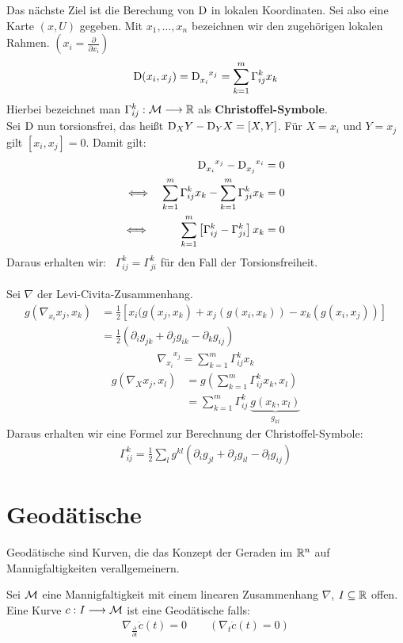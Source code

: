 Das nächste Ziel ist die Berechung von $\mathrm{D}$ in lokalen Koordinaten. Sei also eine Karte $(x, U)$ gegeben. Mit $x_1, \dots, x_n$ bezeichnen wir den zugehörigen lokalen Rahmen. $(x_i = \frac{\partial}{\partial x_i})$
\begin{align}
\mathrm{D}(x_i, x_j)= \mathrm{D}_{x_i}^{\phantom{x_i}x_j} = \sum_{k=1}^{m} \Gamma^k_{ij} x_k
\end{align}
Hierbei bezeichnet man $\Gamma^k_{ij}: \mathcal{M} \longrightarrow \mathbb{R}$ als \textbf{Christoffel-Symbole}. \\
Sei $\mathrm{D}$ nun torsionsfrei, das heißt $\mathrm{D}_XY - \mathrm{D}_YX = [X, Y]$.
Für $X=x_i$ und $Y=x_j$ gilt $[x_i, x_j]=0$. Damit gilt: 
\begin{align*}
\mathrm{D}_{x_i}^{\phantom{x_i} x_j} - \mathrm{D}_{x_j}^{\phantom{x_j}x_i} &= 0 \\
\Longleftrightarrow \quad \sum_{k=1}^{m}\Gamma^k_{ij} x_k - \sum_{k=1}^{m}\Gamma^k_{ji} x_k &= 0\\
\Longleftrightarrow \hspace{1cm} \sum_{k=1}^{m}\left[\Gamma^k_{ij} - \Gamma^k_{ji} \right] x_k &= 0
\end{align*}
Daraus erhalten wir: \ $\Gamma^k_{ij} = \Gamma^k_{ji}$ für den Fall der Torsionsfreiheit. \\
\phantom{.}\\
Sei $\nabla$ der Levi-Civita-Zusammenhang.
\begin{align*}
g(\nabla_{x_i}x_j, x_k) &= \frac{1}{2}\left[x_i(g(x_j, x_k)+ x_j(g(x_i, x_k)) - x_k(g(x_i, x_j)) \right] \\
								 &=  \frac{1}{2}(\partial_i g_{jk} + \partial_j g_{ik} - \partial_k g_{ij})
\end{align*}
\begin{align}
\nabla_{x_i}^{\phantom{x_i}x_j} = \sum_{k=1}^{m}\Gamma_{ij}^k x_k
\end{align}
\begin{align*}
g(\nabla_Xx_j, x_l) &= g\left(\sum_{k=1}^{m}\Gamma_{ij}^k x_k, x_l\right) \\
							&= \sum_{k=1}^{m}\Gamma_{ij}^k \ \underbrace{g(x_k, x_l)}_{g_{kl}}							
\end{align*}
Daraus erhalten wir eine Formel zur Berechnung der Christoffel-Symbole:
\begin{align}
\Gamma_{ij}^k = \frac{1}{2} \sum_{l}g^{kl}\left(\partial_i g_{jl} + \partial_j g_{il} - \partial_l g_{ij}\right)
\end{align}

\chapter{Geodätische}
Geodätische sind Kurven, die das Konzept der Geraden im $\mathbb{R}^n$ auf Mannigfaltigkeiten verallgemeinern.
\begin{defs}[Geodätische]
Sei $\mathcal{M}$ eine Mannigfaltigkeit mit einem linearen Zusammenhang $\nabla$, $I \subseteq \mathbb{R}$ offen. Eine Kurve $c: I \longrightarrow \mathcal{M}$ ist eine Geodätische falls:
\begin{align*} 
\nabla_{\frac{\partial}{\partial t}} \dot{c}(t) = 0 \qquad (\nabla_t \dot{c}(t) = 0)
\end{align*}
\end{defs}
 
